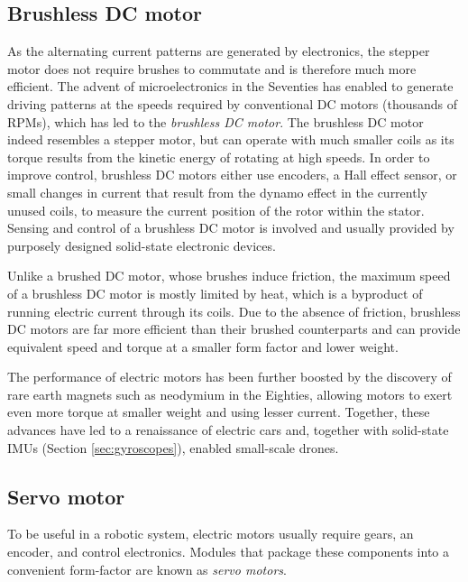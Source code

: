 \subsection{Brushless DC motor}\label{sec:brushlessDC}

As the alternating current patterns are generated by electronics, the stepper motor does not require brushes to commutate and is therefore much more efficient. The advent of microelectronics in the Seventies has enabled to generate driving patterns at the speeds required by conventional DC motors (thousands of RPMs), which has led to the \textsl{brushless DC motor}. The brushless DC motor indeed resembles a stepper motor, but can operate with much smaller coils as its torque results from the kinetic energy of rotating at high speeds. In order to improve control, brushless DC motors either use encoders, a Hall effect sensor, or small changes in current that result from the dynamo effect in the currently unused coils, to measure the current position of the rotor within the stator. Sensing and control of a brushless DC motor is involved and usually provided by purposely designed solid-state electronic devices.

Unlike a brushed DC motor, whose brushes induce friction, the maximum speed of a brushless DC motor is mostly limited by heat, which is a byproduct of running electric current through its coils. Due to the absence of friction, brushless DC motors are far more efficient than their brushed counterparts and can provide equivalent speed and torque at a smaller form factor and lower weight.

The performance of electric motors has been further boosted by the discovery of rare earth magnets such as neodymium in the Eighties, allowing motors to exert even more torque at smaller weight and using lesser current. Together, these advances have led to a renaissance of electric cars and, together with solid-state IMUs (Section \ref{sec:gyroscopes}), enabled small-scale drones.

\subsection{Servo motor}

To be useful in a robotic system, electric motors usually require gears, an encoder, and control electronics. Modules that package these components into a convenient form-factor are known as \textsl{servo motors}.

